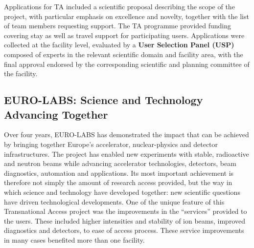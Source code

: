 Applications for TA included a scientific proposal describing the scope of the project, with particular emphasis on excellence and novelty, together with the list of team members requesting support. The TA programme provided funding covering stay as well as travel support for participating users. Applications were collected at the facility level, evaluated by a \textbf{User Selection Panel (USP)} composed of experts in the relevant scientific domain and facility area, with the final approval endorsed by the corresponding  scientific and planning committee of the facility. 




\subsection{EURO-LABS: Science and Technology Advancing Together}
Over four years, EURO-LABS has demonstrated the impact that can be achieved by bringing together Europe’s accelerator, nuclear-physics and detector infrastructures. The project has enabled new experiments with stable, radioactive and neutron beams while advancing accelerator technologies, detectors, beam diagnostics, automation and applications. Its most important achievement is therefore not simply the amount of research access provided, but the way in which science and technology have developed together: new scientific questions have driven technological developments. One of the unique feature of this Transnational Access project was the improvements in  the “services” provided to the users. These included higher intensities and stability of ion beams, improved diagnostics and detectors, to ease of access process. These service improvements in many cases benefited more than one facility.

